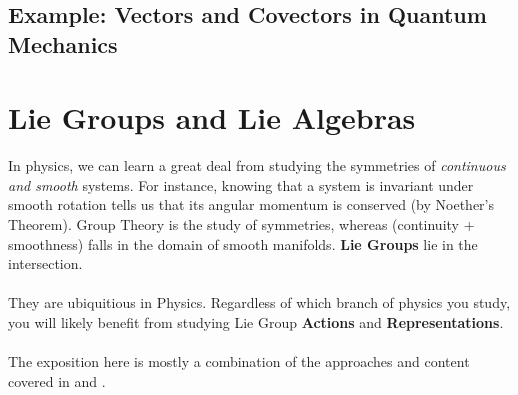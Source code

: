 \documentclass[11pt]{article}
\begin{document}
\subsection{Example: Vectors and Covectors in Quantum Mechanics}


\newpage
\section{Lie Groups and Lie Algebras}

In physics, we can learn a great deal from studying the symmetries of \emph{continuous and smooth} systems. For instance, knowing that a system is invariant under smooth rotation tells us that its angular momentum is conserved (by Noether's Theorem). Group Theory is the study of symmetries, whereas (continuity + smoothness) falls in the domain of smooth manifolds. \textbf{Lie Groups} lie in the intersection.
\\
\\
They are ubiquitious in Physics. Regardless of which branch of physics you study, you will likely benefit from studying Lie Group \textbf{Actions} and \textbf{Representations}.
\\
\\
The exposition here is mostly a combination of the approaches and content covered in \cite{LeeSM} and \cite{SchullerGeomAnatomy}.
\\
\end{document}
